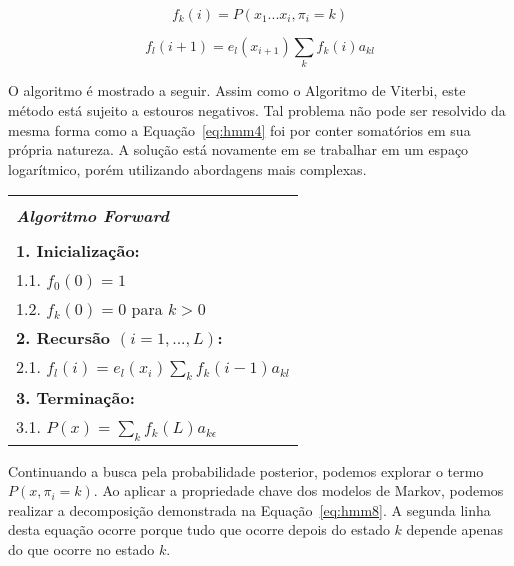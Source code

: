 \begin{equation}\label{eq:hmm7}
    f_k(i) = P(x_1 ... x_i, \pi_i = k)
\end{equation}

\begin{equation}\label{eq:fvar}
    f_l(i+1) = e_l(x_{i+1}) \sum_{k}{f_k(i) a_{kl}}
\end{equation}

O algoritmo é mostrado a seguir. Assim como o Algoritmo de Viterbi, este método está sujeito a estouros negativos. Tal problema não pode ser resolvido da mesma forma como a Equação~\ref{eq:hmm4} foi por conter somatórios em sua própria natureza. A solução está novamente em se trabalhar em um espaço logarítmico, porém utilizando abordagens mais complexas.

\begin{center}
  \begin{spacing}{1.0}
    \begin{tabular}{l}
      \hline \\[-0.25cm]
      \hspace{1.3cm} {\large {\bf \emph{ Algoritmo Forward } } } \hspace{1.3cm} \\[0.1cm]
      \hline \\[-0.25cm]
      \hspace{0.2cm} {\bf 1. Inicialização:} \\
      \hspace{0.9cm} 1.1. $ f_0(0) = 1 $ \\
      \hspace{0.9cm} 1.2. $ f_k(0) = 0 $ para $ k > 0 $ \\
      \hspace{0.2cm} {\bf 2. Recursão $ (i = 1, ..., L) $:} \\
      \hspace{0.9cm} 2.1. $ f_l(i) = e_l(x_i) \sum_{k}{f_k(i-1) a_{kl}} $ \\
      \hspace{0.2cm} {\bf 3. Terminação:} \\
      \hspace{0.9cm} 3.1. $ P(x) = \sum_{k}{f_k(L) a_{k\epsilon}} $ \\[0.1cm]
      \hline
    \end{tabular}
  \end{spacing}
\end{center}

Continuando a busca pela probabilidade posterior, podemos explorar o termo $ P(x, \pi_i = k) $. Ao aplicar a propriedade chave dos modelos de Markov, podemos realizar a decomposição demonstrada na Equação~\ref{eq:hmm8}. A segunda linha desta equação ocorre porque tudo que ocorre depois do estado $ k $ depende apenas do que ocorre no estado $ k $.

